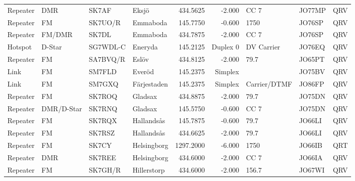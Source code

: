 {\begin{landscape}
\begin{longtable}{llllrrlll}
	Repeater          & DMR             & SK7AF    & Eksjö                &     434.5625 &     -2.000 & CC 7              & JO77MP      & QRV      \\
	Repeater          & FM              & SK7UO/R  & Emmaboda             &     145.7750 &     -0.600 & 1750              & JO76SP      & QRV      \\
	Repeater          & FM/DMR          & SK7DL    & Emmaboda             &     434.7875 &     -2.000 & CC 7              & JO76SP      & QRV      \\
	Hotspot           & D-Star          & SG7WDL-C & Eneryda              &     145.2125 &   Duplex 0 & DV Carrier        & JO76EQ      & QRV      \\
	Repeater          & FM              & SA7BVQ/R & Eslöv                &     434.8125 &     -2.000 & 79.7              & JO65PT      & QRV      \\
	Link              & FM              & SM7FLD   & Everöd               &     145.2375 &    Simplex &                   & JO75BV      & QRV      \\
	Link              & FM              & SM7GXQ   & Färjestaden          &     145.2375 &    Simplex & Carrier/DTMF      & JO86FP      & QRV      \\
	Repeater          & FM              & SK7ROQ   & Gladsax              &     434.8875 &     -2.000 & 79.7              & JO75DN      & QRV      \\
	Repeater          & DMR/D-Star      & SK7RNQ   & Gladsax              &     145.5750 &     -0.600 & CC 7              & JO75DN      & QRV      \\
	Repeater          & FM              & SK7RQX   & Hallandsås           &     145.7875 &     -0.600 & 79.7              & JO66LI      & QRV      \\
	Repeater          & FM              & SK7RSZ   & Hallandsås           &     434.6625 &     -2.000 & 79.7              & JO66LI      & QRV      \\
	Repeater          & FM              & SK7CY    & Helsingborg          &    1297.2000 &     -6.000 & 1750              & JO66IB      & QRT      \\
	Repeater          & DMR             & SK7REE   & Helsingborg          &     434.6000 &     -2.000 & CC 7              & JO66IA      & QRV      \\
	Repeater          & FM              & SK7GH/R  & Hillerstorp          &     434.6000 &     -2.000 & 156.7             & JO67WI      & QRV      \\

\end{longtable}
\end{landscape}}
